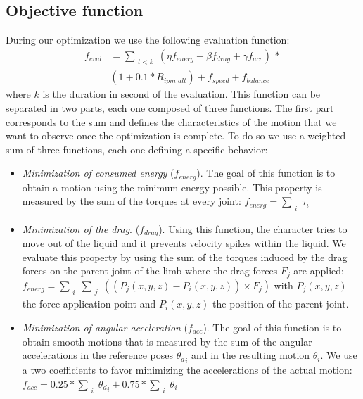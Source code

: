 \documentclass[conference]{acmsiggraph}
\begin{document}
\subsection{Objective function}
During our optimization we use the following evaluation function:
\begin{equation}
\begin{split}
f_{eval} &=\sum_{\substack{t<k}} (\eta f_{energ} + \beta f_{drag} + \gamma f_{acc})\, *\\&(1+0.1* R_{ipm\_alt}) 
+ f_{speed} + f_{balance}
\label{eq:complete_eval}
\end{split}
\end{equation}
where $k$ is the duration in second of the evaluation. This function can be separated in two parts, each one composed of three functions. The first part corresponds to the sum and defines the characteristics of the motion that we want to observe once the optimization is complete. To do so we use a weighted sum of three functions, each one defining a specific behavior:
\begin{itemize}
\item{\textit{Minimization of consumed energy} ($f_{energ}$). The goal of this function is to obtain a motion using the minimum energy possible. This property is measured by the sum of the torques at every joint: $f_{energ}=\sum_{\substack{i}}{\tau_i}$} 
\item{\textit{Minimization of the drag}. ($f_{drag}$). Using this function, the character tries to move out of the liquid and it prevents velocity spikes within the liquid. We evaluate this property by using the sum of the torques induced by the drag forces on the parent joint of the limb where the drag forces $F_j$ are applied: $f_{energ}=\sum_{\substack{i}}\sum_{\substack{j}}((P_j(x,y,z)-P_i(x,y,z)) \times F_j)$ with  $P_j(x,y,z)$ the force application point and $P_i(x,y,z)$ the position of the parent joint.}
\item{\textit{Minimization of angular acceleration} ($f_{acc}$). The goal of this function is to obtain smooth motions that is measured by the sum of the angular accelerations in the reference poses $\ddot{\theta_d}_i$ and in the resulting motion $\ddot{\theta}_i$. We use a two coefficients to favor minimizing the accelerations of the actual motion: $f_{acc}=0.25*\sum_{\substack{i}}\ddot{\theta_d}_i+0.75*\sum_{\substack{i}}\ddot{\theta}_i$ }
\end{itemize}
\end{document}
